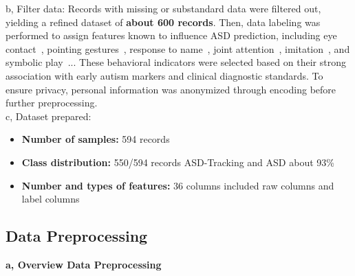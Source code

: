 \documentclass[conference]{IEEEtran}
\begin{document}
b, Filter data: Records with missing or substandard data were filtered out, yielding a refined dataset of \textbf{about 600 records}. Then, data labeling was performed to assign features known to influence ASD prediction, including eye contact~\cite{b8}, pointing gestures~\cite{b9}, response to name~\cite{b10}, joint attention~\cite{b11}, imitation~\cite{b12}, and symbolic play~\cite{b13}... These behavioral indicators were selected based on their strong association with early autism markers and clinical diagnostic standards. To ensure privacy, personal information was anonymized through encoding before further preprocessing.\\

c, Dataset prepared:
\begin{itemize}
    \item \textbf{Number of samples:} 594 records
    \item \textbf{Class distribution:} 550/594 records ASD-Tracking and ASD about 93\%
    \item \textbf{Number and types of features:} 36 columns included raw columns and label columns
\end{itemize}
\subsection{Data Preprocessing}
\textbf{a, Overview Data Preprocessing}
\begin{table}[H]
\caption{Data Preprocessing Steps for private dataset}
\label{tab:preprocessing}
\centering
{}
\end{table}
\end{document}
